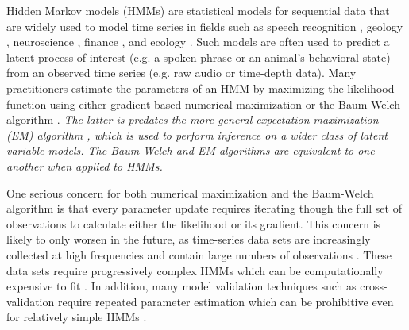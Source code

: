 

Hidden Markov models (HMMs) are statistical models for sequential data that are widely used to model time series in fields such as speech recognition \citep{Gales:2008}, geology \citep{Bebbington:2007}, neuroscience \citep{Kottaram:2019}, finance \citep{Mamon:2007}, and ecology \citep{McClintock:2020}. Such models are often used to predict a latent process of interest (e.g. a spoken phrase or an animal's behavioral state) from an observed time series (e.g. raw audio or time-depth data). %
Many practitioners estimate the parameters of an HMM by maximizing the likelihood function using either gradient-based numerical maximization or the Baum-Welch algorithm \citep{Baum:1970}. \textit{The latter is predates the more general expectation-maximization (EM) algorithm \citep{Dempster:1977}, which is used to perform inference on a wider class of latent variable models. The Baum-Welch and EM algorithms are equivalent to one another when applied to HMMs.}

One serious concern for both numerical maximization and the Baum-Welch algorithm is that every parameter update requires iterating though the full set of observations to calculate either the likelihood or its gradient. This concern is likely to only worsen in the future, as time-series data sets are increasingly collected at high frequencies and contain large numbers of observations \citep{Patterson:2017,Li:2020}. These data sets require progressively complex HMMs which can be computationally expensive to fit \citep{Adam:2019,Sidrow:2021}. In addition, many model validation techniques such as cross-validation require repeated parameter estimation which can be prohibitive even for relatively simple HMMs \citep{Pohle:2017}.

